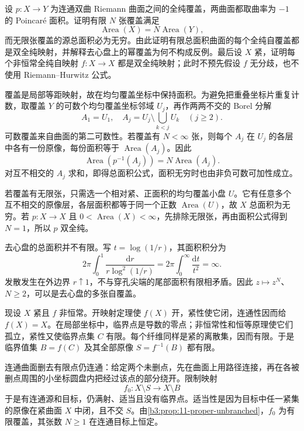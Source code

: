 \begin{exercise}[面积、覆盖张数与紧曲面自映射]\label{b3:ex:13-8}
设 \(p:X\rightarrow Y\) 为连通双曲 Riemann 曲面之间的全纯覆盖，两曲面都取曲率为 \(-1\) 的 Poincaré 面积。证明有限 \(N\) 张覆盖满足
\[
 \operatorname{Area}(X)=N\operatorname{Area}(Y),
\]
而无限张覆盖的源总面积必为无穷。由此证明有限总面积曲面的每个全纯自覆盖都是双全纯映射，并解释去心盘上的幂覆盖为何不构成反例。最后设 \(X\) 紧，证明每个非恒常全纯自映射 \(f:X\rightarrow X\) 都是双全纯映射；此时不预先假设 \(f\) 无分歧，也不使用 Riemann--Hurwitz 公式。
\end{exercise}
\begin{solution}
覆盖是局部等距映射，故在均匀覆盖坐标中保持面积。为避免把重叠坐标片重复计数，取覆盖 \(Y\) 的可数个均匀覆盖坐标邻域 \(U_j\)，再作两两不交的 Borel 分解
\[
 A_1=U_1,\quad A_j=U_j\setminus\bigcup_{k<j}U_k\quad(j\ge2).
\]
可数覆盖来自曲面的第二可数性。若覆盖有 \(N<\infty\) 张，则每个 \(A_j\) 在 \(U_j\) 的各层中各有一份原像，每份面积等于 \(\operatorname{Area}(A_j)\)。因此
\[
 \operatorname{Area}(p^{-1}(A_j))=N\operatorname{Area}(A_j).
\]
对互不相交的 \(A_j\) 求和，即得总面积公式，面积无穷时也由非负可数可加性成立。

若覆盖有无限张，只需选一个相对紧、正面积的均匀覆盖小盘 \(U\)。它有任意多个互不相交的原像层，各层面积都等于同一个正数 \(\operatorname{Area}(U)\)，故 \(X\) 总面积为无穷。若 \(p:X\rightarrow X\) 且 \(0<\operatorname{Area}(X)<\infty\)，先排除无限张，再由面积公式得到 \(N=1\)，所以 \(p\) 双全纯。

去心盘的总面积并不有限。写 \(t=\log(1/r)\)，其面积积分为
\[
 2\pi\int_0^1\frac{\mathrm dr}{r\log^2(1/r)}
 =2\pi\int_0^\infty\frac{\mathrm dt}{t^2}=\infty.
\]
发散发生在外边界 \(r\uparrow1\)，不与穿孔尖端的尾部面积有限相矛盾。因此 \(z\mapsto z^N\)、\(N\ge2\)，可以是去心盘的多张自覆盖。

现设 \(X\) 紧且 \(f\) 非恒常。开映射定理使 \(f(X)\) 开，紧性使它闭，连通性因而给 \(f(X)=X\)。在局部坐标中，临界点是导数的零点；非恒常性和恒等原理使它们孤立，紧性又使临界点集 \(C\) 有限。每个纤维同样是紧的离散集，因而有限。于是临界值集 \(B=f(C)\) 及其全部原像 \(S=f^{-1}(B)\) 都有限。

连通曲面删去有限点仍连通：给定两个未删点，先在曲面上用路径连接，再在各被删点周围的小坐标圆盘内把经过该点的部分绕开。限制映射
\[
 f_0:X\setminus S\longrightarrow X\setminus B
\]
于是有连通源和目标，仍满射、适当且没有临界点。适当性是因为目标中任一紧集的原像在紧曲面 \(X\) 中闭，且不交 \(S\)。由\cref{b3:prop:11-proper-unbranched}，\(f_0\) 为有限覆盖，其张数 \(N\ge1\) 在连通目标上恒定。


\end{solution}

